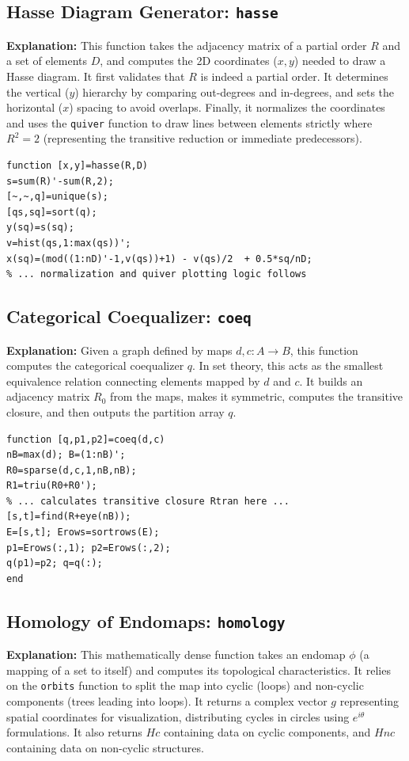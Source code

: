 \subsection{Hasse Diagram Generator: \texttt{hasse}}
\textbf{Explanation:} This function takes the adjacency matrix of a partial order $R$ and a set of elements $D$, and computes the 2D coordinates ($x, y$) needed to draw a Hasse diagram. It first validates that $R$ is indeed a partial order. It determines the vertical ($y$) hierarchy by comparing out-degrees and in-degrees, and sets the horizontal ($x$) spacing to avoid overlaps. Finally, it normalizes the coordinates and uses the \texttt{quiver} function to draw lines between elements strictly where $R^2 = 2$ (representing the transitive reduction or immediate predecessors).

\begin{lstlisting}[caption={Hasse Diagram Generator Snippet}]
function [x,y]=hasse(R,D)
s=sum(R)'-sum(R,2);
[~,~,q]=unique(s);
[qs,sq]=sort(q);
y(sq)=s(sq);
v=hist(qs,1:max(qs))';
x(sq)=(mod((1:nD)'-1,v(qs))+1) - v(qs)/2  + 0.5*sq/nD;
% ... normalization and quiver plotting logic follows
\end{lstlisting}

\subsection{Categorical Coequalizer: \texttt{coeq}}
\textbf{Explanation:} Given a graph defined by maps $d, c: A \to B$, this function computes the categorical coequalizer $q$. In set theory, this acts as the smallest equivalence relation connecting elements mapped by $d$ and $c$. It builds an adjacency matrix $R_0$ from the maps, makes it symmetric, computes the transitive closure, and then outputs the partition array $q$.

\begin{lstlisting}[caption={Categorical Coequalizer Snippet}]
function [q,p1,p2]=coeq(d,c)
nB=max(d); B=(1:nB)';
R0=sparse(d,c,1,nB,nB);
R1=triu(R0+R0');
% ... calculates transitive closure Rtran here ...
[s,t]=find(R+eye(nB));
E=[s,t]; Erows=sortrows(E);
p1=Erows(:,1); p2=Erows(:,2);
q(p1)=p2; q=q(:);
end
\end{lstlisting}

\subsection{Homology of Endomaps: \texttt{homology}}
\textbf{Explanation:} This mathematically dense function takes an endomap $\phi$ (a mapping of a set to itself) and computes its topological characteristics. It relies on the \texttt{orbits} function to split the map into cyclic (loops) and non-cyclic components (trees leading into loops). It returns a complex vector $g$ representing spatial coordinates for visualization, distributing cycles in circles using $e^{i\theta}$ formulations. It also returns $Hc$ containing data on cyclic components, and $Hnc$ containing data on non-cyclic structures.

